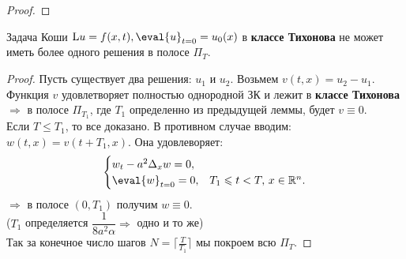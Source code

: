 \begin{itemize}
\begin{lemma}
\begin{proof}
\end{proof}
\end{lemma}

\begin{theorem}
Задача Коши $\mathrm{L}u = f(x,t), \eval{u}_{t = 0} = u_0(x)$ в {\bf классе Тихонова} не может иметь более одного решения в полосе $\Pi_T$.

\begin{proof}
Пусть существует два решения: $u_1$ и $u_2$. Возьмем $v(t,x) = u_2 - u_1$. Функция $v$ удовлетворяет полностью однородной ЗК и лежит в {\bf классе Тихонова} 
$\Rightarrow$ в полосе $\Pi_{T_1}$, где $T_1$ определенно из предыдущей леммы, будет $v\equiv 0$.\\
Если $T \leq T_1$, то все доказано. В противном случае вводим:\\
$w(t,x) = v(t+T_1,x)$. Она удовлеворяет:
  \begin{equation}
  \begin{cases}
  w_t - a^2\Delta_xw=0,\\
  \eval{w}_{t=0} = 0, & T_1 \leq t < T, \, x \in \R^n.
  \end{cases}
  \end{equation}
$\Rightarrow$ в полосе $(0,T_1)$ получим $w \equiv 0$.\\
($T_1$ определяется $\dfrac{1}{8a^2\alpha} \Rightarrow$ одно и то же)\\
Так за конечное число шагов $N = \lceil{\frac{T}{T_1}} \rceil$ мы покроем всю $\Pi_T$.
\end{proof} 
\end{theorem}


\end{itemize}
